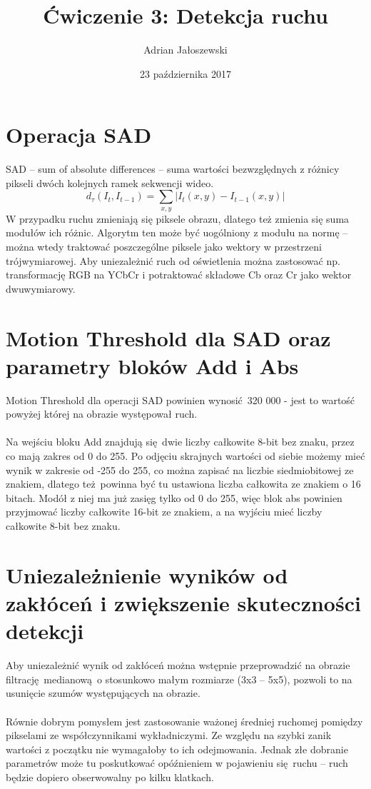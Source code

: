 \documentclass[a4paper, 12pt, titlepage]{article}
\author{Adrian Jałoszewski}
\title{Ćwiczenie 3: Detekcja ruchu}
\date{23 października 2017}
\begin{document}
    \maketitle
    \section{Operacja SAD}
        SAD -- sum of absolute differences -- suma wartości bezwzględnych
        z różnicy pikseli dwóch kolejnych ramek sekwencji wideo.
        $$
            d_{\tau}(I_t, I_{t-1}) = \sum_{x, y} |I_t(x,y) - I_{t-1}(x,y)|
        $$
        W przypadku ruchu zmieniają się piksele obrazu, dlatego też zmienia
        się suma modułów ich różnic. Algorytm ten może być uogólniony z modułu
        na normę -- można wtedy traktować poszczególne piksele jako wektory
        w przestrzeni trójwymiarowej. Aby uniezależnić ruch od oświetlenia 
        można zastosować np. transformację RGB na YCbCr i potraktować składowe
        Cb oraz Cr jako wektor dwuwymiarowy.
    \section{Motion Threshold dla SAD oraz parametry bloków Add i Abs}
        Motion Threshold dla operacji SAD powinien wynosić 320 000 - jest to wartość
        powyżej której na obrazie występował ruch.
        \\ \\
        Na wejściu bloku Add znajdują się dwie liczby całkowite 8-bit bez znaku,
        przez co mają zakres od 0 do 255. Po odjęciu skrajnych wartości od siebie
        możemy mieć wynik w zakresie od -255 do 255, co można zapisać na liczbie
        siedmiobitowej ze znakiem, dlatego też powinna być tu ustawiona liczba 
        całkowita ze znakiem o 16 bitach. Modół z niej ma już zasięg tylko od
        0 do 255, więc blok abs powinien przyjmować liczby całkowite 16-bit ze 
        znakiem, a na wyjściu mieć liczby całkowite 8-bit bez znaku.
    \section{Uniezależnienie wyników od zakłóceń i zwiększenie skuteczności detekcji}
        Aby uniezależnić wynik od zakłóceń można wstępnie przeprowadzić na obrazie
        filtrację medianową o stosunkowo małym rozmiarze (3x3 -- 5x5), pozwoli to
        na usunięcie szumów występujących na obrazie. 
        \\ \\        
        Równie dobrym pomysłem jest zastosowanie ważonej średniej ruchomej pomiędzy 
        pikselami ze współczynnikami wykładniczymi. Ze względu na szybki zanik 
        wartości z początku nie wymagałoby to ich odejmowania. Jednak złe dobranie 
        parametrów może tu poskutkować opóźnieniem w pojawieniu się ruchu --
        ruch będzie dopiero obserwowalny po kilku klatkach.
\end{document}
